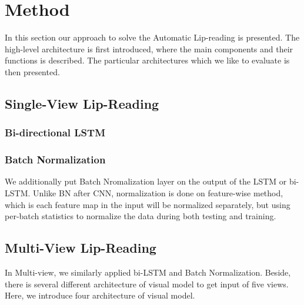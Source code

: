 \section{Method}
\label{sec:method}

In this section our approach to solve the Automatic Lip-reading is presented.
The high-level architecture is first introduced, where the main components and their functions is described.
The particular architectures which we like to evaluate is then presented.

\subsection{Single-View Lip-Reading}

\subsubsection{Bi-directional LSTM}

\subsubsection{Batch Normalization}
We additionally put Batch Nromalization layer on the output of the LSTM or bi-LSTM. Unlike BN after CNN, normalization is done on feature-wise method, which is each feature map in the input will be normalized separately, but using per-batch statistics to normalize the data during both testing and training.

\subsection{Multi-View Lip-Reading}
In Multi-view, we similarly applied bi-LSTM and Batch Normalization. Beside, there is several different architecture of visual model to get input of five views. Here, we introduce four architecture of visual model. 
